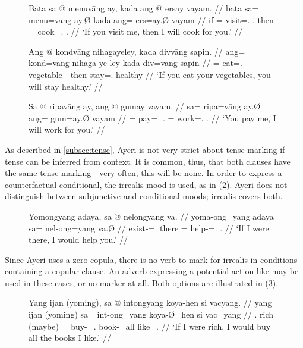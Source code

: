 \begin{figure}
\pex\label{ex:condcs}
\a\label{ex:condcs_1}\begingl
	\gla Bata sa @ menuvāng ay, kada ang @ ersay vayam. //
	\glb bata sa= menu=vāng ay.Ø kada ang= ers=ay.Ø vayam //
	\glc if \PatT{}= visit=\Second.\Aarg{} \Fsg{}.\Top{} then \AgtT{}=
		cook=\Fsg{}.\Top{} \Second.\Dat{} //
	\glft `If you visit me, then I will cook for you.' //
\endgl

\a\label{ex:condcs_2}\begingl
	\gla Ang @ kondvāng nihagayeley, kada divvāng sapin. //
	\glb ang= kond=vāng nihaga-ye-ley kada div=vāng sapin //
	\glc \AgtT{}= eat=\Second.\Aarg{} vegetable-\Pl{}-\PargI{} then
		stay=\Second{}.\Aarg{} healthy //
	\glft `If you eat your vegetables, you will stay healthy.' //
\endgl

\a\label{ex:condcs_3}\begingl
	\gla Sa @ ripavāng ay, ang @ gumay vayam. //
	\glb sa= ripa=vāng ay.Ø ang= gum=ay.Ø vayam //
	\glc \PatT{}= pay=\Second{}.\Aarg{} \Fsg{}.\Top{} \Aarg{}=
		work=\Fsg{}.\Aarg{} \Second{}.\Dat{} //
	\glft `You pay me, I will work for you.' //
\endgl

\xe
\end{figure}

As described in \autoref{subsec:tense}, Ayeri is not very strict about tense
marking if tense can be inferred from context. It is common, thus, that both
clauses have the same tense marking---very often, this will be none. In order
to express a counterfactual conditional, the irrealis mood is used, as in 
(\ref{ex:condcntfact}). Ayeri does not distinguish between subjunctive and
conditional moods; irrealis covers both.

\begin{figure}[h]
\ex\label{ex:condcntfact}\begingl
	\gla Yomongyang adaya, sa @ nelongyang va. //
	\glb yoma-ong=yang adaya sa= nel-ong=yang va.Ø //
	\glc exist-\Irr{}=\Fsg{}.\Aarg{} there \PatT{}= help-\Irr{}=\Fsg{}.\Aarg{} 
		\Second{}.\Parg{} //
	\glft `If I were there, I would help you.' //
\endgl\xe
\end{figure}

Since Ayeri uses a zero-copula, there is no verb to mark for irrealis in
conditions containing a copular clause. An adverb expressing a potential action
like  may be used in these cases, or
no marker at all. Both options are illustrated in (\ref{ex:copcond}).

\begin{figure}[h]
\ex\label{ex:copcond}\begingl
	\gla Yang ijan \textup{(}yoming\textup{)}, sa @ intongyang koya-hen si
		vacyang. //
	\glb yang ijan (yoming) sa= int-ong=yang koya-Ø=hen si vac=yang //
	\glc \Fsg{}.\Aarg{} rich (maybe) \PatT{}= buy-\Irr{}=\Fsg{}.\Aarg{}
		book-\Top{}=all \Rel{} like=\Fsg{}.\Aarg{} //
	\glft `If I were rich, I would buy all the books I like.' //
\endgl\xe
\end{figure}

